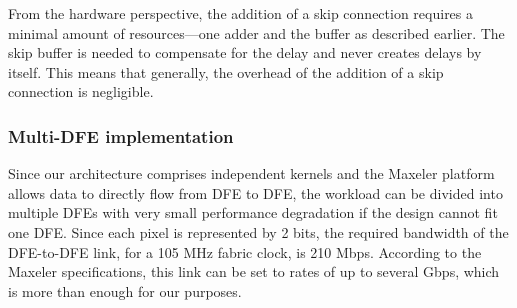 \documentclass[conference]{IEEEtran}
\begin{document}
	From the hardware perspective, the addition of a skip connection requires a minimal amount of resources---one adder and the buffer as described earlier. The skip buffer is needed to compensate for the delay and never creates delays by itself. This means that generally, the overhead of the addition of a skip connection is negligible.
	
	\subsubsection{Multi-DFE implementation}
	Since our architecture comprises independent kernels and the Maxeler platform allows data to directly flow from DFE to DFE, the workload can be divided into multiple DFEs with very small performance degradation if the design cannot fit one DFE. Since each pixel is represented by 2 bits, the required bandwidth of the DFE-to-DFE link, for a 105 MHz fabric clock, is 210 Mbps. According to the Maxeler specifications, this link can be set to rates of up to several Gbps, which is more than enough for our purposes.
	
\end{document}
